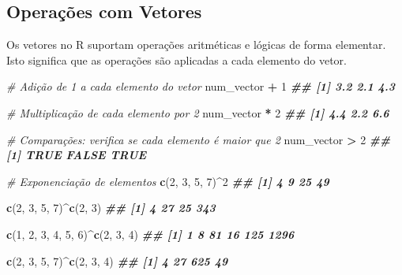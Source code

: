 \documentclass[
]{book}
\newenvironment{Shaded}{\begin{snugshade}}{\end{snugshade}}
\newcommand{\CommentTok}[1]{\textcolor[rgb]{0.56,0.35,0.01}{\textit{#1}}}
\newcommand{\DecValTok}[1]{\textcolor[rgb]{0.00,0.00,0.81}{#1}}
\newcommand{\DocumentationTok}[1]{\textcolor[rgb]{0.56,0.35,0.01}{\textbf{\textit{#1}}}}
\newcommand{\FunctionTok}[1]{\textcolor[rgb]{0.13,0.29,0.53}{\textbf{#1}}}
\newcommand{\NormalTok}[1]{#1}
\newcommand{\SpecialCharTok}[1]{\textcolor[rgb]{0.81,0.36,0.00}{\textbf{#1}}}
\begin{document}
\subsection{Operações com Vetores}\label{operauxe7uxf5es-com-vetores}

Os vetores no R suportam operações aritméticas e lógicas de forma
elementar. Isto significa que as operações são aplicadas a cada elemento
do vetor.

\begin{Shaded}
\begin{Highlighting}[]
\CommentTok{\# Adição de 1 a cada elemento do vetor}
\NormalTok{num\_vector }\SpecialCharTok{+} \DecValTok{1}  
\DocumentationTok{\#\# [1] 3.2 2.1 4.3}

\CommentTok{\# Multiplicação de cada elemento por 2}
\NormalTok{num\_vector }\SpecialCharTok{*} \DecValTok{2}  
\DocumentationTok{\#\# [1] 4.4 2.2 6.6}

\CommentTok{\# Comparações: verifica se cada elemento é maior que 2}
\NormalTok{num\_vector }\SpecialCharTok{\textgreater{}} \DecValTok{2}  
\DocumentationTok{\#\# [1]  TRUE FALSE  TRUE}

\CommentTok{\# Exponenciação de elementos}
\FunctionTok{c}\NormalTok{(}\DecValTok{2}\NormalTok{, }\DecValTok{3}\NormalTok{, }\DecValTok{5}\NormalTok{, }\DecValTok{7}\NormalTok{)}\SpecialCharTok{\^{}}\DecValTok{2}
\DocumentationTok{\#\# [1]  4  9 25 49}

\FunctionTok{c}\NormalTok{(}\DecValTok{2}\NormalTok{, }\DecValTok{3}\NormalTok{, }\DecValTok{5}\NormalTok{, }\DecValTok{7}\NormalTok{)}\SpecialCharTok{\^{}}\FunctionTok{c}\NormalTok{(}\DecValTok{2}\NormalTok{, }\DecValTok{3}\NormalTok{)}
\DocumentationTok{\#\# [1]   4  27  25 343}

\FunctionTok{c}\NormalTok{(}\DecValTok{1}\NormalTok{, }\DecValTok{2}\NormalTok{, }\DecValTok{3}\NormalTok{, }\DecValTok{4}\NormalTok{, }\DecValTok{5}\NormalTok{, }\DecValTok{6}\NormalTok{)}\SpecialCharTok{\^{}}\FunctionTok{c}\NormalTok{(}\DecValTok{2}\NormalTok{, }\DecValTok{3}\NormalTok{, }\DecValTok{4}\NormalTok{)}
\DocumentationTok{\#\# [1]    1    8   81   16  125 1296}

\FunctionTok{c}\NormalTok{(}\DecValTok{2}\NormalTok{, }\DecValTok{3}\NormalTok{, }\DecValTok{5}\NormalTok{, }\DecValTok{7}\NormalTok{)}\SpecialCharTok{\^{}}\FunctionTok{c}\NormalTok{(}\DecValTok{2}\NormalTok{, }\DecValTok{3}\NormalTok{, }\DecValTok{4}\NormalTok{)}
\DocumentationTok{\#\# [1]   4  27 625  49}
\end{Highlighting}
\end{Shaded}
\end{document}
